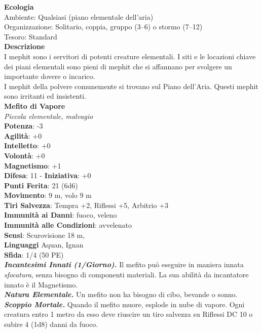 \begin{multicols}{2}
\textbf{Ecologia}\\
Ambiente: Qualsiasi (piano elementale dell'aria)\\
Organizzazione: Solitario, coppia, gruppo (3–6) o stormo (7–12)\\
Tesoro: Standard\\
\textbf{Descrizione}\\
I mephit sono i servitori di potenti creature elementali. I siti e le locazioni chiave dei piani elementali sono pieni di mephit che si affannano per svolgere un importante dovere o incarico.\\
I mephit della polvere comunemente si trovano sul Piano dell’Aria. Questi mephit sono irritanti ed insistenti.\\


\medskip\textbf{Mefito di Vapore}\\
\emph{Piccola elementale, malvagio}\\
\textbf{Potenza}: -3\\
\textbf{Agilità}: +0\\
\textbf{Intelletto}: +0\\
\textbf{Volontà}: +0\\
\textbf{Magnetismo}: +1\\
\textbf{Difesa}: 11 - \textbf{Iniziativa}: +0\\
\textbf{Punti Ferita}: 21 (6d6)\\
\textbf{Movimento}: 9 m, volo 9 m\\
\textbf{Tiri Salvezza}: Tempra +2, Riflessi +5, Arbitrio +3\\
\textbf{Immunità ai Danni}: fuoco, veleno\\
\textbf{Immunità alle Condizioni}: avvelenato\\
\textbf{Sensi}: Scurovisione 18 m, \\
\textbf{Linguaggi} Aquan, Ignan\\
\textbf{Sfida}: 1/4 (50 PE)\smallskip\\
\emph{\textbf{Incantesimi Innati (1/Giorno).}} Il mefito può eseguire in maniera innata \emph{sfocatura}, senza bisogno di componenti materiali. La sua abilità da incantatore innato è il Magnetismo.\\
\emph{\textbf{Natura Elementale.}} Un mefito non ha bisogno di cibo, bevande o sonno.\\
\emph{\textbf{Scoppio Mortale.}} Quando il mefito muore, esplode in nube di vapore. Ogni creatura entro 1 metro da esso deve riuscire un tiro salvezza su Riflessi DC 10 o subire 4 (1d8) danni da fuoco. \\

\end{multicols}
